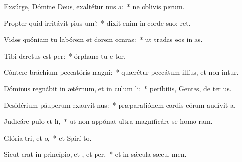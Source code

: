 \item Exsúrge, Dómine Deus, exaltétur nus a:~* ne oblivis perum.
\item Propter quid irritávit pius um?~* dixit enim in corde suo:  ret.
\item Vides quóniam tu labórem et dorem conras:~* ut tradas eos in  as.
\item Tibi deretus est per:~* órphano tu e tor.
\item Cóntere bráchium peccatóris  magni:~* quærétur peccátum illíus, et non intur.
\item Dóminus regnábit in ætérnum, et in culum li:~* períbitis, Gentes, de ter us.
\item Desidérium páuperum exauvit nus:~* præparatiónem cordis eórum audívit  a.
\item Judicáre pulo et li,~* ut non appónat ultra magnificáre se homo  ram.
\item Glória tri, et o,~* et Spirí to.
\item Sicut erat in princípio, et , et per,~* et in sǽcula sæcu. men.
